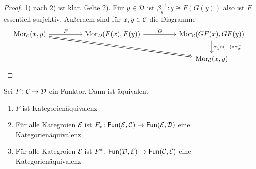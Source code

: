 \begin{proof}
    1) nach 2) ist klar. Gelte 2). Für \(y\in\mathcal{D}\) ist \(\beta_y^{-1}\colon y\cong F(G(y))\) also ist \(F\) essentiell surjektiv. Außerdem sind für \(x,y\in\mathcal{C}\) die Diagramme 
    $$%
\begin{tikzcd}
{\Mor_\calC(x,y)} \arrow[rrrrd, no head, Rightarrow] \arrow[rr, "F"] &  & {\Mor_\calD(F(x),F(y))} \arrow[rr, "G"] &  & {\Mor_\calC(GF(x),GF(y))} \arrow[d, "\alpha_y\circ (-)\circ\alpha_x^{-1}"] \\
                                                                     &  &                                         &  & {\Mor_\calC(x,y)}                                                         
\end{tikzcd}$$
\end{proof}
\begin{Bem}
    Sei \(F\colon \mathcal{C}\to\mathcal{D}\) ein Funktor. Dann ist äquivalent 
    \begin{enumerate}
        \item \(F\) ist Kategorienäquivalenz
        \item Für alle Kategroien \(\mathcal{E}\) ist \(F_*\colon \mathsf{Fun}(\mathcal{E},\mathcal{C})\to \mathsf{Fun}(\mathcal{E},\mathcal{D})\) eine Kategorienäquivalenz
        \item Für alle Kategroien \(\mathcal{E}\) ist \(F^*\colon \mathsf{Fun}(\mathcal{D},\mathcal{E})\to \mathsf{Fun}(\mathcal{C},\mathcal{E})\) eine Kategorienäquivalenz    \end{enumerate}
\end{Bem}
